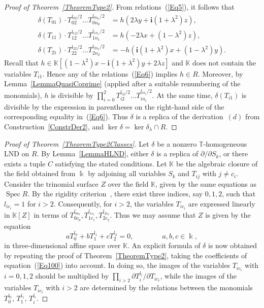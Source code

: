 \documentclass[a4paper,reqno,12pt]{amsart}
\theoremstyle{plain}
\theoremstyle{definition}
\theoremstyle{plain}
\theoremstyle{remark}
\DeclareMathOperator{\Spec}{Spec}
\newcommand{\KK}{\mathbb K}
\newcommand{\TT}{\mathbb{T}}
\newcommand{\ii}{\mathbf{i}}
\begin{document}
\begin{proof}[Proof of Theorem~\ref{TheoremType2}]
From relations~(\ref{Eq5}), it follows that
\begin{equation}\label{Eq6}
    \begin{split}
    \delta(T_{01})\cdot{T_{02}^{l_{02}/2}\dots T_{0n_0}^{l_{0n_0}/2}} &=h \left(2\lambda y + \ii (1+\lambda^2)z \right),\\
        \delta(T_{11})\cdot{T_{12}^{l_{12}/2}\dots T_{1n_1}^{l_{1n_1}/2}} &= h\left(-2\lambda x + (1-\lambda^2)z \right),\\
         \delta(T_{21})\cdot{T_{22}^{l_{22}/2}\dots T_{2n_2}^{l_{2n_2}/2}} &=-h(\ii(1+\lambda^2)x+(1-\lambda^2)y).
    \end{split}
    \tag{6.5}
\end{equation}
    Recall that $h \in\KK[(1-\lambda^2)x-\ii(1+\lambda^2)y + 2\lambda z]$ and $\KK$ does not contain the variables $T_{i1}$. Hence any of the relations~(\ref{Eq6}) implies $h\in R$.
    Moreover, by Lemma~\ref{LemmaQuasiCoprime} (applied after a suitable renumbering of the monomials), $h$ is divisible by $\prod_{i=0}^{2}{T_{i2}^{l_{i2}/2}\dots T_{in_i}^{l_{in_i}/2}}$. At the same time, $\delta(T_{i1})$ is divisible by the expression in parentheses on the right-hand side of the corresponding equality in~(\ref{Eq6}). Thus $\delta$ is a replica of the derivation~$(d)$ from Construction~\ref{ConstrDer2}, and $\ker\delta=\ker\delta_\lambda\cap R$.
\end{proof}

\begin{proof}[Proof of Theorem~\ref{TheoremType2Classes}]
    Let $\delta$ be a nonzero ${\TT}$-homogeneous LND on $R$. By Lemma~\ref{LemmaHLND}, either $\delta$ is a replica of ${\partial/\partial S_k}$, or there exists a tuple $C$ satisfying the stated conditions. Let $\KK$ be the algebraic closure of the field obtained from $\Bbbk$ by adjoining all variables $S_k$ and $T_{ij}$ with $j\neq c_i$. Consider the trinomial surface $Z$ over the field $\KK$, given by the same equations as $\Spec R$. By the rigidity criterion~\cite[Theorem~4]{EGSh}, there exist three indices, say $0,1,2$, such that $l_{ic_i}=1$ for $i>2$. Consequently, for $i>2$, the variables $T_{ic_i}$ are expressed linearly in $\KK[Z]$ in terms of $T_{0c_0}^{l_{0c_0}}, T_{1c_1}^{l_{1c_1}}, T_{2c_2}^{l_{2c_2}}$. Thus we may assume that $Z$ is given by the equation \begin{equation}\label{Eq100}
        aT_0^{l_0}+bT_1^{l_1} + c T_2^{l_2}=0,\qquad\qquad a,b,c\in\Bbbk,
        \tag{6.6}
    \end{equation}
    in three-dimensional affine space over $\KK$.
    An explicit formula of $\delta$ is now obtained by repeating the proof of Theorem~\ref{TheoremType2}, taking the coefficients of equation~(\ref{Eq100}) into account. In doing so, the images of the variables $T_{ic_i}$ with $i=0,1,2$ should be multiplied by $\prod_{i>2} {\partial T_i^{l_i}/\partial T_{ic_i}}$, while the images of the variables $T_{ic_i}$ with $i>2$ are determined by the relations between the monomials $T_0^{l_0},\,T_1^{l_1},\,T_i^{l_i}$.
\end{proof}
\end{document}
